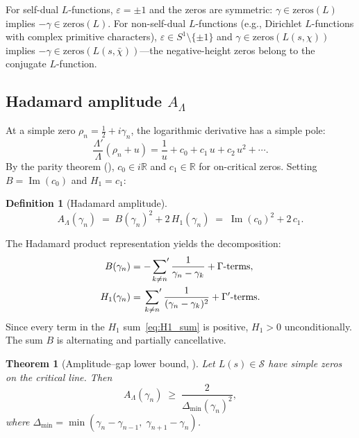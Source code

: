 \documentclass[11pt, a4paper]{article}
\theoremstyle{plain}
\newtheorem{theorem}{Theorem}
\theoremstyle{definition}
\newtheorem{definition}{Definition}[section]
\newcommand{\Lam}{\Lambda}
\begin{document}
For self-dual $L$-functions, $\varepsilon = \pm 1$ and the zeros
are symmetric: $\gamma \in \mathrm{zeros}(L)$ implies
$-\gamma \in \mathrm{zeros}(L)$.
For non-self-dual $L$-functions (e.g., Dirichlet $L$-functions
with complex primitive characters), $\varepsilon \in S^1
\setminus \{\pm 1\}$ and
$\gamma \in \mathrm{zeros}(L(s,\chi))$ implies
$-\gamma \in \mathrm{zeros}(L(s,\bar{\chi}))$---the
negative-height zeros belong to the conjugate $L$-function.


\subsection{Hadamard amplitude $A_\Lam$}
\label{ssec:amplitude_def}

At a simple zero $\rho_n = \tfrac{1}{2} + i\gamma_n$, the
logarithmic derivative has a simple pole:
\begin{equation}\label{eq:laurent}
  \frac{\Lam'}{\Lam}(\rho_n + u) = \frac{1}{u}
  + c_0 + c_1\, u + c_2\, u^2 + \cdots.
\end{equation}
By the parity theorem (\cite[Theorem~5]{paper2}),
$c_0 \in i\mathbb{R}$ and $c_1 \in \mathbb{R}$ for on-critical
zeros.  Setting $B = \operatorname{Im}(c_0)$ and $H_1 = c_1$:

\begin{definition}[Hadamard amplitude]\label{def:amplitude}
\begin{equation}\label{eq:amplitude_def}
  A_\Lam(\gamma_n)
  \;=\; B(\gamma_n)^2 + 2\,H_1(\gamma_n)
  \;=\; \operatorname{Im}(c_0)^2 + 2\,c_1.
\end{equation}
\end{definition}

The Hadamard product representation yields the decomposition:
\begin{align}
  B(\gamma_n) &= -\sideset{}{'}\sum_{k \ne n}
    \frac{1}{\gamma_n - \gamma_k}
    + \Gamma\text{-terms},
  \label{eq:B_sum} \\
  H_1(\gamma_n) &= \sideset{}{'}\sum_{k \ne n}
    \frac{1}{(\gamma_n - \gamma_k)^2}
    + \Gamma'\text{-terms}.
  \label{eq:H1_sum}
\end{align}
Since every term in the $H_1$ sum~\eqref{eq:H1_sum} is positive,
$H_1 > 0$ unconditionally.  The sum $B$ is alternating and
partially cancellative.

\begin{theorem}[Amplitude--gap lower bound, {\cite[Theorem~1]{paper4draft}}]
\label{thm:lower_bound}
Let $L(s) \in \mathcal{S}$ have simple zeros on the critical line.
Then
\begin{equation}\label{eq:lower_bound}
  A_\Lam(\gamma_n) \;\ge\; \frac{2}{\Delta_{\min}(\gamma_n)^2},
\end{equation}
where $\Delta_{\min} = \min(\gamma_n - \gamma_{n-1},\;
\gamma_{n+1} - \gamma_n)$.
\end{theorem}
\end{document}
